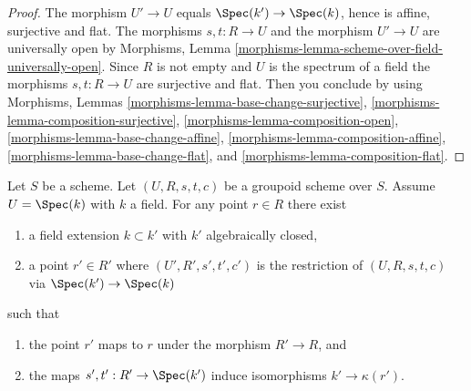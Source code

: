 \begin{proof}
The morphism $U' \to U$ equals $\Spec(k') \to \Spec(k)$,
hence is affine, surjective and flat. The morphisms $s, t : R \to U$
and the morphism $U' \to U$ are universally open by
Morphisms, Lemma \ref{morphisms-lemma-scheme-over-field-universally-open}.
Since $R$ is not empty and $U$ is the spectrum of a field the morphisms
$s, t : R \to U$ are surjective and flat. Then you conclude by using
Morphisms, Lemmas \ref{morphisms-lemma-base-change-surjective},
\ref{morphisms-lemma-composition-surjective},
\ref{morphisms-lemma-composition-open},
\ref{morphisms-lemma-base-change-affine},
\ref{morphisms-lemma-composition-affine},
\ref{morphisms-lemma-base-change-flat}, and
\ref{morphisms-lemma-composition-flat}.
\end{proof}

\begin{lemma}
\label{lemma-groupoid-on-field-explain-points}
Let $S$ be a scheme. Let $(U, R, s, t, c)$ be a groupoid scheme
over $S$. Assume $U = \Spec(k)$ with $k$ a field.
For any point $r \in R$ there exist
\begin{enumerate}
\item a field extension $k \subset k'$ with $k'$ algebraically closed,
\item a point $r' \in R'$ where $(U', R', s', t', c')$ is the
restriction of $(U, R, s, t, c)$ via $\Spec(k') \to \Spec(k)$
\end{enumerate}
such that
\begin{enumerate}
\item the point $r'$ maps to $r$ under the morphism $R' \to R$, and
\item the maps $s', t' : R' \to \Spec(k')$ induce isomorphisms
$k' \to \kappa(r')$.
\end{enumerate}
\end{lemma}

